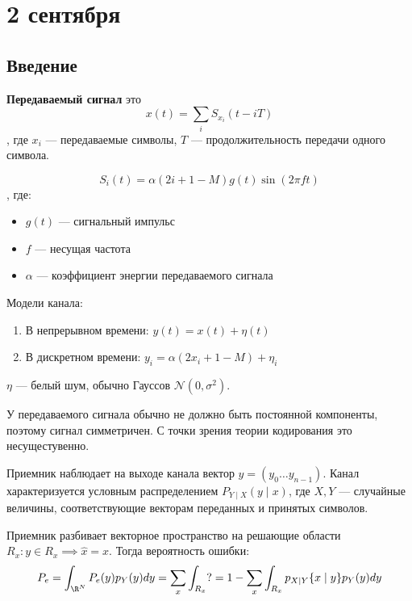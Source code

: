 \chapter{2 сентября}

\section{Введение}

\begin{definition}
    \textbf{Передаваемый сигнал} это
    \[x(t) = \sum_i S_{x_i} (t - iT)\]
    , где \(x_i\) --- передаваемые символы, \(T\) --- продолжительность передачи одного символа.
\end{definition}

\begin{example}
    \[S_i(t) = \alpha(2i + 1 - M)g(t) \sin(2 \pi ft)\] 
    , где:
    \begin{itemize}
        \item \(g(t)\) --- сигнальный импульс
        \item \(f\) --- несущая частота
        \item \(\alpha\) --- коэффициент энергии передаваемого сигнала
    \end{itemize}
\end{example}

Модели канала:
\begin{enumerate}
    \item В непрерывном времени: \(y(t) = x(t) + \eta(t)\)
    \item В дискретном времени: \(y_i = \alpha(2 x_i + 1 - M) + \eta_i\)
\end{enumerate}

\(\eta\) --- белый шум, обычно Гауссов \(\mathcal{N}(0, \sigma^2)\).

У передаваемого сигнала обычно не должно быть постоянной компоненты, поэтому сигнал симметричен.
С точки зрения теории кодирования это несущестувенно.

Приемник наблюдает на выходе канала вектор \(y = (y_0 \ldots y_{n-1})\).
Канал характеризуется условным распределением \(P_{Y \mid X}(y \mid x)\),
где \(X, Y\) --- случайные величины, соответствующие векторам переданных и принятых символов.

Приемник разбивает векторное пространство на решающие области \(R_x : y \in R_x \implies \hat{x} = x\).
Тогда вероятность ошибки:
\[P_e = \int_{\R^N} P_e(y) p_Y(y) dy = \sum_x \int_{R_x} ? = 1 - \sum_x \int_{R_x} p_{X \mid Y} \{x \mid y\} p_Y(y) dy\] 


